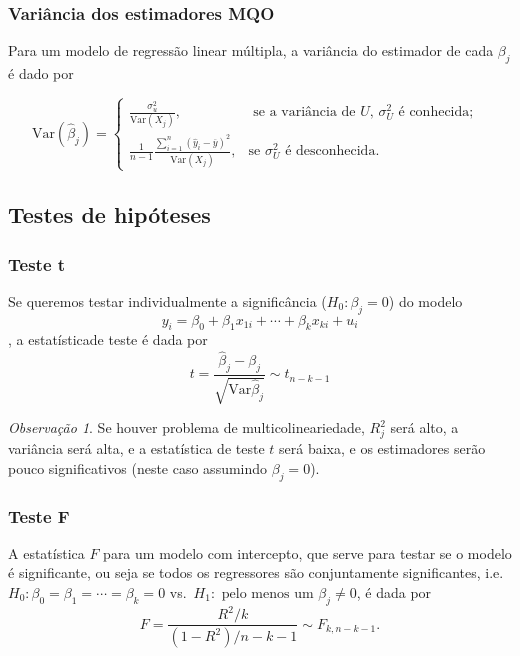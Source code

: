 \documentclass[
]{book}
\theoremstyle{definition}
\theoremstyle{definition}
\theoremstyle{definition}
\theoremstyle{remark}
\newtheorem*{remark}{Observação}
\begin{document}
\hypertarget{variuxe2ncia-dos-estimadores-mqo}{%
\subsubsection{Variância dos estimadores MQO}\label{variuxe2ncia-dos-estimadores-mqo}}

Para um modelo de regressão linear múltipla, a variância do estimador de cada \(\beta_j\) é dado por

\[\mbox{Var}(\hat{\beta}_j)=
\begin{cases}
\frac{\sigma^2_u}{\mbox{Var}(X_j)}, &\mbox{ se a variância de $U$, $\sigma_U^2$ é conhecida};  \,\,\,\\
  \frac{1}{n-1}\frac{\sum_{i=1}^{n}(\hat{y}_i-\overline{y})^2}{\mbox{Var}(X_j)},& \mbox{se  $\sigma_U^2$ é desconhecida} .
\end{cases} \]

\hypertarget{testes-de-hipuxf3teses}{%
\subsection{Testes de hipóteses}\label{testes-de-hipuxf3teses}}

\hypertarget{teste-t}{%
\subsubsection{Teste t}\label{teste-t}}

Se queremos testar individualmente a significância (\(H_0: \beta_j=0\)) do
modelo \[y_i=\beta_0+ \beta_1x_{1i}+\cdots+\beta_kx_{ki} +u_i \], a estatísticade teste é dada por
\[t=\frac{\hat{\beta}_j-\beta_j}{\sqrt{\mbox{Var}{\hat{\beta}_j}}}\sim t_{n-k-1}\]

\begin{remark}
{} Se houver problema de multicolineariedade, \(R^2_j\) será alto, a variância será alta, e a estatística de teste \(t\) será baixa, e os estimadores serão pouco significativos (neste caso assumindo \(\beta_j=0\)).
\end{remark}

\hypertarget{teste-f}{%
\subsubsection{Teste F}\label{teste-f}}

A estatística \(F\) para um modelo com intercepto, que serve para testar se o modelo é significante, ou seja se todos os regressores são conjuntamente significantes, i.e.~\(H_0: \beta_0=\beta_1=\cdots=\beta_k=0\) vs.~\(H_1:\mbox{ pelo menos um }\beta_j\neq 0\),
é dada por
\[F=\frac{R^2/k}{(1-R^2)/n-k-1}\sim F_{k,n-k-1}.\]
\end{document}
